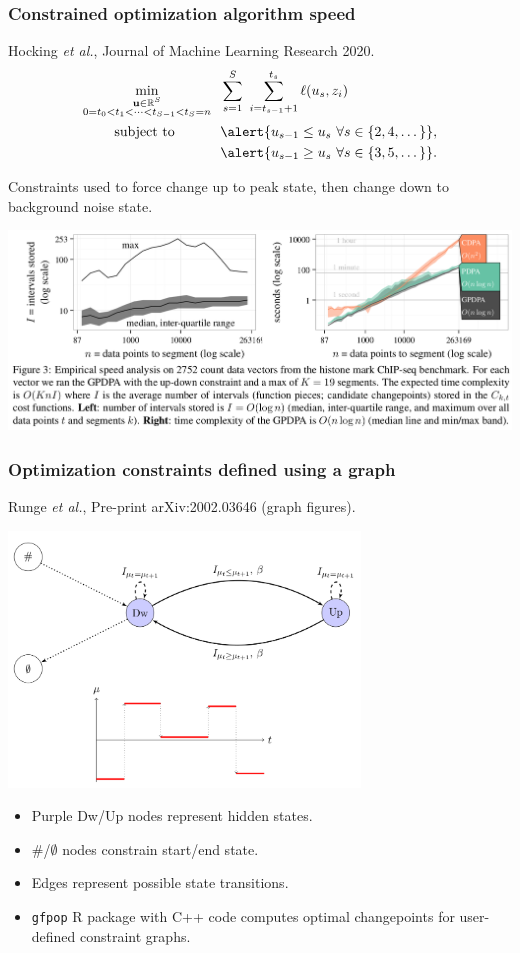 \documentclass{beamer}
\newcommand{\RR}{\mathbb R}
\begin{document}
\begin{frame}
  \frametitle{Constrained optimization algorithm speed}
  Hocking {\it et al.}, Journal of Machine Learning Research 2020. 
\vskip -0.5cm
\begin{align*}
\min_{\substack{
  \mathbf u\in\RR^{S}
\\
   0=t_0<t_1<\cdots<t_{S-1}<t_S=n
}} & \ \
    \sum_{s=1}^S\  \sum_{i=t_{s-1}+1}^{t_s} \ell( u_s,  z_i) 
\\
      \text{subject to \hskip 0.8cm} &\ \ 
\alert{ u_{s-1} \leq u_s\ \forall s\in\{2,4,\dots\} },
  \nonumber\\
  &\ \ 
\alert{ u_{s-1} \geq u_s\ \forall s\in\{3,5,\dots\} }.
  \nonumber
\end{align*}

\alert{Constraints used to force change up to peak state, then change
  down to background noise state.}

\includegraphics[width=\textwidth]{screenshot-GPDPA-intervals}

\end{frame}

\begin{frame}
  \frametitle{Optimization constraints defined using a graph}
  Runge \emph{et al.}, Pre-print arXiv:2002.03646 (graph figures).

  \includegraphics[width=0.7\textwidth]{gfpop-up-down}

  \begin{itemize}
  \item Purple Dw/Up nodes represent hidden states.
  \item \#/$\emptyset$ nodes constrain start/end state.
  \item Edges represent possible state transitions.
  \item \texttt{gfpop} R package with C++ code computes optimal
    changepoints for user-defined constraint graphs.
  \end{itemize}

\end{frame}
\end{document}
